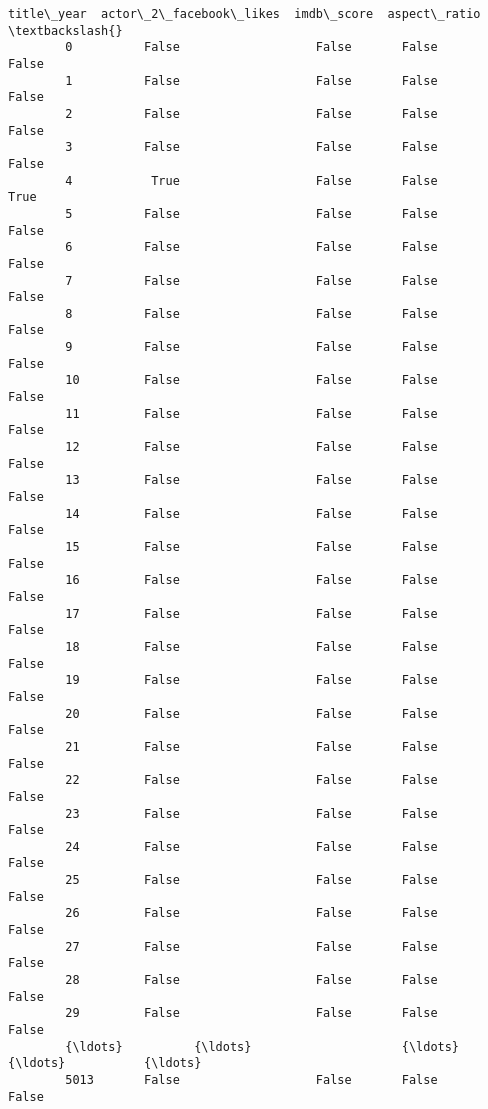 \documentclass[11pt]{article}
\begin{document}
\begin{Verbatim}[commandchars=\\\{\}]
              title\_year  actor\_2\_facebook\_likes  imdb\_score  aspect\_ratio  \textbackslash{}
        0          False                   False       False         False   
        1          False                   False       False         False   
        2          False                   False       False         False   
        3          False                   False       False         False   
        4           True                   False       False          True   
        5          False                   False       False         False   
        6          False                   False       False         False   
        7          False                   False       False         False   
        8          False                   False       False         False   
        9          False                   False       False         False   
        10         False                   False       False         False   
        11         False                   False       False         False   
        12         False                   False       False         False   
        13         False                   False       False         False   
        14         False                   False       False         False   
        15         False                   False       False         False   
        16         False                   False       False         False   
        17         False                   False       False         False   
        18         False                   False       False         False   
        19         False                   False       False         False   
        20         False                   False       False         False   
        21         False                   False       False         False   
        22         False                   False       False         False   
        23         False                   False       False         False   
        24         False                   False       False         False   
        25         False                   False       False         False   
        26         False                   False       False         False   
        27         False                   False       False         False   
        28         False                   False       False         False   
        29         False                   False       False         False   
        {\ldots}          {\ldots}                     {\ldots}         {\ldots}           {\ldots}   
        5013       False                   False       False         False   

\end{Verbatim}
\end{document}
